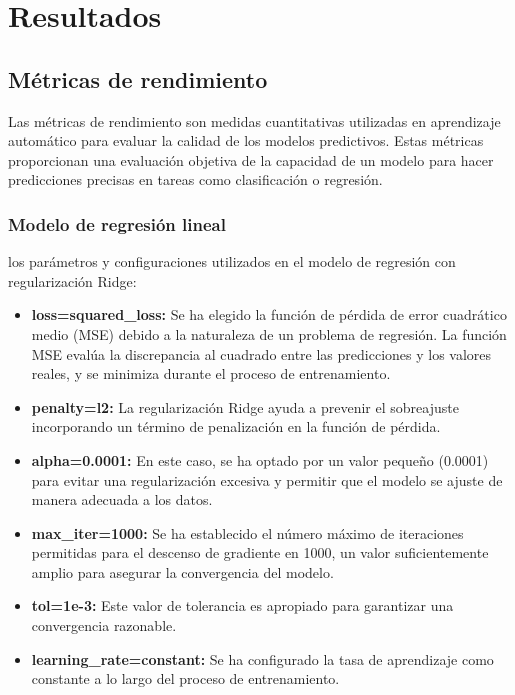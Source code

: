 \fancyhead{}
\fancyfoot{}
\cfoot{\thepage}


\chapter{Resultados}

\section{Métricas de rendimiento}
Las métricas de rendimiento son medidas cuantitativas utilizadas en aprendizaje automático para evaluar la calidad de los modelos predictivos. Estas métricas proporcionan una evaluación objetiva de la capacidad de un modelo para hacer predicciones precisas en tareas como clasificación o regresión. 
\subsection{Modelo de regresión lineal}

los parámetros y configuraciones utilizados en el modelo de regresión con regularización Ridge:

\begin{itemize}
  \item  \textbf{loss=squared\_loss:} Se ha elegido la función de pérdida de error cuadrático medio (MSE) debido a la naturaleza de un problema de regresión. La función MSE evalúa la discrepancia al cuadrado entre las predicciones y los valores reales, y se minimiza durante el proceso de entrenamiento.

    
  \item \textbf{penalty=l2:} La regularización Ridge ayuda a prevenir el sobreajuste incorporando un término de penalización en la función de pérdida.

  
  \item \textbf{alpha=0.0001:}  En este caso, se ha optado por un valor pequeño (0.0001) para evitar una regularización excesiva y permitir que el modelo se ajuste de manera adecuada a los datos.

  
  \item \textbf{max\_iter=1000:} Se ha establecido el número máximo de iteraciones permitidas para el descenso de gradiente en 1000, un valor suficientemente amplio para asegurar la convergencia del modelo.

  
  \item \textbf{tol=1e-3:} Este valor de tolerancia es apropiado para garantizar una convergencia razonable.

  
  \item \textbf{learning\_rate=constant:} Se ha configurado la tasa de aprendizaje como constante a lo largo del proceso de entrenamiento.
\end{itemize}
   
